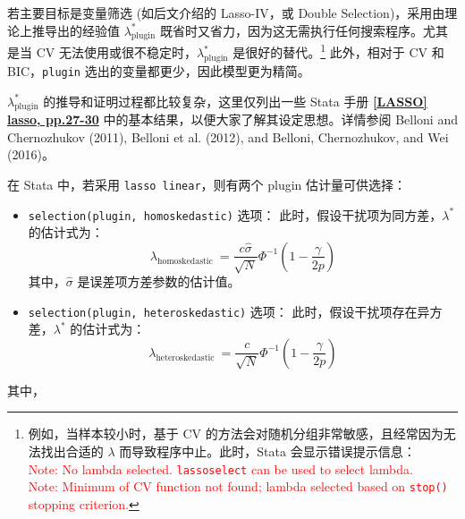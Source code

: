 若主要目标是变量筛选 (如后文介绍的 Lasso-IV，或 Double Selection)，采用由理论上推导出的经验值 $\lambda_{\text{plugin}}^*$ 既省时又省力，因为这无需执行任何搜索程序。尤其是当 CV 无法使用或很不稳定时，$\lambda_{\text{plugin}}^*$ 是很好的替代。\footnote{%
   例如，当样本较小时，基于 CV 的方法会对随机分组非常敏感，且经常因为无法找出合适的 $\lambda$ 而导致程序中止。此时，Stata 会显示错误提示信息：{\\ \textcolor{red}{Note: No lambda selected. \texttt{lassoselect} can be used to select lambda. \\
   Note: Minimum of CV function not found; lambda selected based on \texttt{stop()} stopping criterion.}}}
此外，相对于 CV 和 BIC，\texttt{plugin} 选出的变量都更少，因此模型更为精简。


$\lambda_{\text{plugin}}^*$ 的推导和证明过程都比较复杂，这里仅列出一些 Stata 手册 \href{https://www.stata.com/manuals/lassolasso.pdf}{\bfseries{[\MakeUppercase{lasso}] lasso, pp.27-30}} 
中的基本结果，以便大家了解其设定思想。详情参阅 Belloni and Chernozhukov (2011), Belloni et al. (2012), and Belloni, Chernozhukov, and Wei (2016)。



在 Stata 中，若采用 \texttt{lasso linear}，则有两个 plugin 估计量可供选择：
\begin{itemize}
\item \texttt{selection(plugin, homoskedastic)} 选项：
此时，假设干扰项为同方差，$\lambda^*$ 的估计式为：
\begin{equation}\label{eq:lasso-plugin-01}
	\lambda_{\text {homoskedastic }}=\frac{c \widehat{\sigma}}{\sqrt{N}} \Phi^{-1}\left(1-\frac{\gamma}{2 p}\right)
\end{equation}
其中，$\widehat{\sigma}$ 是误差项方差参数的估计值。
\item \texttt{selection(plugin, heteroskedastic)} 选项：
此时，假设干扰项存在异方差，$\lambda^*$ 的估计式为：
\begin{equation}\label{eq:lasso-plugin-02}
\lambda_{\text {heteroskedastic }}=\frac{c}{\sqrt{N}} \Phi^{-1}\left(1-\frac{\gamma}{2 p}\right)
\end{equation}
\end{itemize}
其中，

